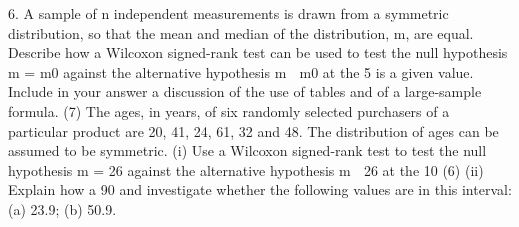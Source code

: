 
6. A sample of n independent measurements is drawn from a symmetric distribution, so
that the mean and median of the distribution, m, are equal. Describe how a Wilcoxon
signed-rank test can be used to test the null hypothesis m = m0
against the alternative
hypothesis m  m0
at the 5%
is a given value. Include in your answer
a discussion of the use of tables and of a large-sample formula.
(7)
The ages, in years, of six randomly selected purchasers of a particular product are 20,
41, 24, 61, 32 and 48. The distribution of ages can be assumed to be symmetric.
(i) Use a Wilcoxon signed-rank test to test the null hypothesis m = 26 against the
alternative hypothesis m  26 at the 10%
(6)
(ii) Explain how a 90%
and investigate whether the following values are in this interval:
(a) 23.9;
(b) 50.9.

